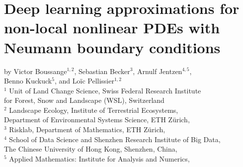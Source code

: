 \graphicspath{{./content/chap2_NonlocalPDE/figures/}}


\chapter{Deep learning approximations for non-local nonlinear PDEs with Neumann boundary conditions}
\label{chap:nonlocalPDE}

by Victor Boussange$^{1,2}$, 
Sebastian Becker$^{3}$,
Arnulf Jentzen$^{4,5}$,\\
Benno Kuckuck$^{5}$,
and 
Lo{\"i}c Pellissier$^{1,2}$\bigskip
\\
\small{$^1$ Unit of Land Change Science, Swiss Federal Research Institute}
\vspace{-0.1cm}\\
\small{for Forest, Snow and Landscape (WSL), Switzerland}
\smallskip
\\
\small{$^2$ Landscape Ecology, Institute of Terrestrial Ecosystems,}
\vspace{-0.1cm}\\
\small{Department of Environmental Systems Science, ETH Z\"urich,}
\smallskip
\\
\small{$^3$ Risklab, Department of Mathematics, ETH Z\"urich,}
\smallskip
\\
\small{$^4$ School of Data Science and Shenzhen Research Institute of Big Data,}
\vspace{-0.1cm}\\
\small{The Chinese University of Hong Kong, Shenzhen, China,}
\smallskip
\\
\small{$^5$ Applied Mathematics: Institute for Analysis and Numerics,}
\vspace{-0.1cm}\\
